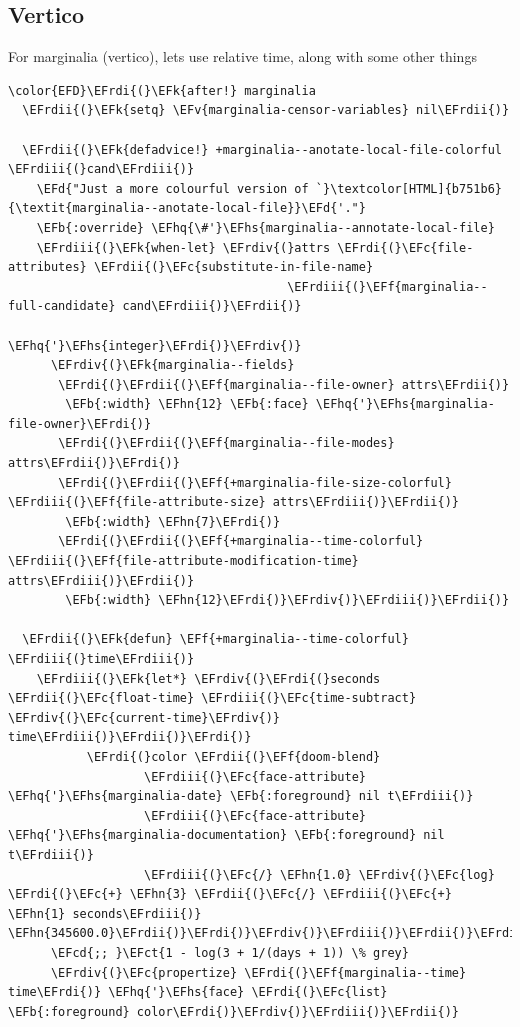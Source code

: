 \documentclass{scrartcl}
\newcommand{\EFk}[1]{\textcolor{EFk}{#1}} %
\newcommand{\EFd}[1]{\textcolor{EFd}{\textit{#1}}} %
\newcommand{\EFb}[1]{\textcolor{EFb}{#1}} %
\newcommand{\EFct}[1]{\textcolor{EFct}{#1}} %
\newcommand{\EFc}[1]{\textcolor{EFc}{#1}} %
\newcommand{\EFv}[1]{\textcolor{EFv}{#1}} %
\newcommand{\EFf}[1]{\textcolor{EFf}{#1}} %
\newcommand{\EFcd}[1]{\textcolor{EFcd}{#1}} %
\newcommand{\EFhn}[1]{\textcolor{EFhn}{\textbf{#1}}} %
\newcommand{\EFhq}[1]{\textcolor{EFhq}{#1}} %
\newcommand{\EFhs}[1]{\textcolor{EFhs}{#1}} %
\newcommand{\EFrdi}[1]{\textcolor{EFrdi}{#1}} %
\newcommand{\EFrdii}[1]{\textcolor{EFrdii}{#1}} %
\newcommand{\EFrdiii}[1]{\textcolor{EFrdiii}{#1}} %
\newcommand{\EFrdiv}[1]{\textcolor{EFrdiv}{#1}} %
\begin{document}
\subsection{Vertico}
\label{sec:orgdb2cff4}
For marginalia (vertico), lets use relative time, along with some other things
\begin{Code}
\begin{Verbatim}[]
\color{EFD}\EFrdi{(}\EFk{after!} marginalia
  \EFrdii{(}\EFk{setq} \EFv{marginalia-censor-variables} nil\EFrdii{)}

  \EFrdii{(}\EFk{defadvice!} +marginalia--anotate-local-file-colorful \EFrdiii{(}cand\EFrdiii{)}
    \EFd{"Just a more colourful version of `}\textcolor[HTML]{b751b6}{\textit{marginalia--anotate-local-file}}\EFd{'."}
    \EFb{:override} \EFhq{\#'}\EFhs{marginalia--annotate-local-file}
    \EFrdiii{(}\EFk{when-let} \EFrdiv{(}attrs \EFrdi{(}\EFc{file-attributes} \EFrdii{(}\EFc{substitute-in-file-name}
                                       \EFrdiii{(}\EFf{marginalia--full-candidate} cand\EFrdiii{)}\EFrdii{)}
                                      \EFhq{'}\EFhs{integer}\EFrdi{)}\EFrdiv{)}
      \EFrdiv{(}\EFk{marginalia--fields}
       \EFrdi{(}\EFrdii{(}\EFf{marginalia--file-owner} attrs\EFrdii{)}
        \EFb{:width} \EFhn{12} \EFb{:face} \EFhq{'}\EFhs{marginalia-file-owner}\EFrdi{)}
       \EFrdi{(}\EFrdii{(}\EFf{marginalia--file-modes} attrs\EFrdii{)}\EFrdi{)}
       \EFrdi{(}\EFrdii{(}\EFf{+marginalia-file-size-colorful} \EFrdiii{(}\EFf{file-attribute-size} attrs\EFrdiii{)}\EFrdii{)}
        \EFb{:width} \EFhn{7}\EFrdi{)}
       \EFrdi{(}\EFrdii{(}\EFf{+marginalia--time-colorful} \EFrdiii{(}\EFf{file-attribute-modification-time} attrs\EFrdiii{)}\EFrdii{)}
        \EFb{:width} \EFhn{12}\EFrdi{)}\EFrdiv{)}\EFrdiii{)}\EFrdii{)}

  \EFrdii{(}\EFk{defun} \EFf{+marginalia--time-colorful} \EFrdiii{(}time\EFrdiii{)}
    \EFrdiii{(}\EFk{let*} \EFrdiv{(}\EFrdi{(}seconds \EFrdii{(}\EFc{float-time} \EFrdiii{(}\EFc{time-subtract} \EFrdiv{(}\EFc{current-time}\EFrdiv{)} time\EFrdiii{)}\EFrdii{)}\EFrdi{)}
           \EFrdi{(}color \EFrdii{(}\EFf{doom-blend}
                   \EFrdiii{(}\EFc{face-attribute} \EFhq{'}\EFhs{marginalia-date} \EFb{:foreground} nil t\EFrdiii{)}
                   \EFrdiii{(}\EFc{face-attribute} \EFhq{'}\EFhs{marginalia-documentation} \EFb{:foreground} nil t\EFrdiii{)}
                   \EFrdiii{(}\EFc{/} \EFhn{1.0} \EFrdiv{(}\EFc{log} \EFrdi{(}\EFc{+} \EFhn{3} \EFrdii{(}\EFc{/} \EFrdiii{(}\EFc{+} \EFhn{1} seconds\EFrdiii{)} \EFhn{345600.0}\EFrdii{)}\EFrdi{)}\EFrdiv{)}\EFrdiii{)}\EFrdii{)}\EFrdi{)}\EFrdiv{)}
      \EFcd{;; }\EFct{1 - log(3 + 1/(days + 1)) \% grey}
      \EFrdiv{(}\EFc{propertize} \EFrdi{(}\EFf{marginalia--time} time\EFrdi{)} \EFhq{'}\EFhs{face} \EFrdi{(}\EFc{list} \EFb{:foreground} color\EFrdi{)}\EFrdiv{)}\EFrdiii{)}\EFrdii{)}


\end{Verbatim}
\end{Code}
\end{document}
